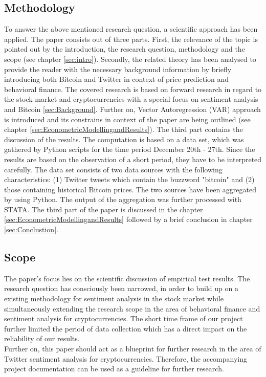 \documentclass[a4paper,american,12pt]{article}
\begin{document}
\begin{spacing}{1.2}
\subsection{Methodology}
\label{sec:Methodology}
To answer the above mentioned research question, a scientific approach has been applied. The paper consists out of three parts. First, the relevance of the topic is pointed out by the introduction, the research question, methodology and the scope (see chapter \ref{sec:intro}). Secondly, the related theory has been analysed to provide the reader with the necessary background information by briefly introducing both Bitcoin and Twitter in context of price prediction and behavioral finance. The covered research is based on forward research in regard to the stock market and cryptocurrencies with a special focus on sentiment analysis and Bitcoin \ref{sec:Background}. Further on,  Vector Autoregression (VAR) approach is introduced and its constrains in context of the paper are being outlined (see chapter \ref{sec:EconometricModellingandResults}). The third part contains the discussion of the results. The computation is based on a data set, which was gathered by Python scripts for the time period December 20th - 27th. Since the results are based on the observation of a short period, they have to be interpreted carefully. The data set consists of two data sources with the following characteristics: (1) Twitter tweets which contain the buzzword "bitcoin" and (2) those containing historical Bitcoin prices. The two sources have been aggregated by using Python. The output of the aggregation was further processed with STATA. The third part of the paper is discussed in the chapter \ref{sec:EconometricModellingandResults} followed by a brief conclusion in chapter \ref{sec:Conclustion}.

\subsection{Scope}
\label{sec:Scope}
The paper's focus lies on the scientific discussion of empirical test results. The research question has consciously been narrowed, in order to build up on a existing methodology for sentiment analysis in the stock market while simultaneously extending the research scope in the area of behavioral finance and sentiment analysis for cryptocurrencies. The short time frame of our project further limited the period of data collection which has a direct impact on the reliability of our results.\\
Further on, this paper should act as a blueprint for further research in the area of Twitter sentiment analysis for cryptocurrencies. Therefore, the accompanying project documentation can be used as a guideline for further research.


\end{spacing}
\end{document}
